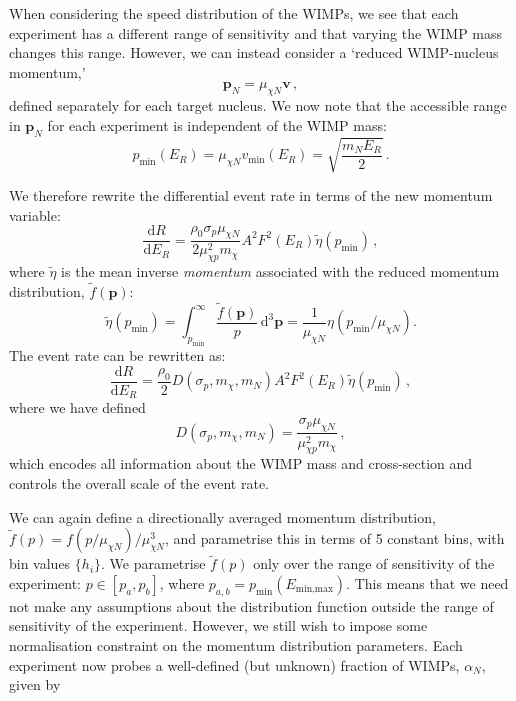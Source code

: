 When considering the speed distribution of the WIMPs, we see that each experiment has a different range of sensitivity and that varying the WIMP mass changes this range. However, we can instead consider a `reduced WIMP-nucleus momentum,'
\begin{equation}
\textbf{p}_N = \mu_{\chi N} \textbf{v} \,,
\end{equation}
defined separately for each target nucleus. We now note that the accessible range in \(\textbf{p}_N\) for each experiment is independent of the WIMP mass:
\begin{equation}
p_\textrm{min}(E_R) = \mu_{\chi N} v_\textrm{min}(E_R) = \sqrt{\frac{m_N E_R}{2}} \,.
\end{equation}

We therefore rewrite the differential event rate in terms of the new momentum variable:
\begin{equation}
\frac{\textrm{d}R}{\textrm{d}E_R} = \frac{\rho_0 \sigma_p \mu_{\chi N}}{2 \mu_{\chi p}^2 m_\chi} A^2 F^2(E_R) \tilde{\eta}(p_{\textrm{min}})\,,
\end{equation}
where \(\tilde{\eta}\) is the mean inverse \textit{momentum} associated with the reduced momentum distribution, \(\tilde{f}(\textbf{p})\):
\begin{equation}
\tilde{\eta}(p_{\textrm{min}}) = \int_{p_{\textrm{min}}}^\infty \frac{\tilde{f}(\textbf{p})}{p}\, \textrm{d}^3\textbf{p} = \frac{1}{\mu_{\chi N}}\eta(p_\textrm{min}/\mu_{\chi N}).
\end{equation}
The event rate can be rewritten as:
\begin{equation}
\frac{\textrm{d}R}{\textrm{d}E_R} = \frac{\rho_0}{2} D(\sigma_p,m_\chi,m_N) A^2 F^2(E_R) \tilde{\eta}(p_{\textrm{min}}) \,,
\end{equation}
where we have defined
\begin{equation}
D(\sigma_p,m_\chi,m_N) = \frac{\sigma_p \mu_{\chi N}}{\mu_{\chi p}^2 m_\chi} \,,
\end{equation}
which encodes all information about the WIMP mass and cross-section and controls the overall scale of the event rate. 

We can again define a directionally averaged momentum distribution, \(\tilde{f}(p) = f(p/\mu_{\chi N})/\mu_{\chi N}^3\), and parametrise this in terms of 5 constant bins, with bin values \(\{h_i\}\). We parametrise \(\tilde{f}(p)\) only over the range of sensitivity of the experiment: \(p \in \left[p_a, p_b\right]\), where \(p_{a,b} = p_\textrm{min}(E_\textrm{min,max})\). This means that we need not make any assumptions about the distribution function outside the range of sensitivity of the experiment. However, we still wish to impose some normalisation constraint on the momentum distribution parameters. Each experiment now probes a well-defined (but unknown) fraction of WIMPs, \(\alpha_N\), given by

